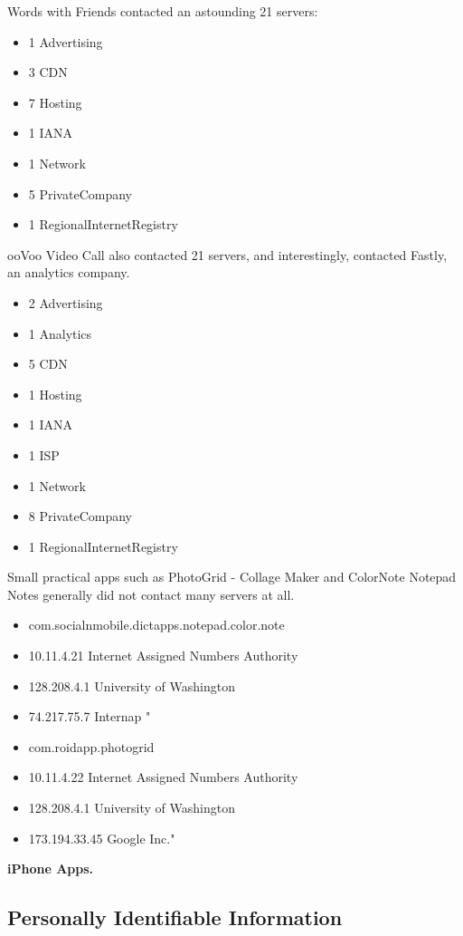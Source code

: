    Words with Friends contacted an astounding 21 servers:
\begin{itemize}
\item    1 Advertising
\item    3 CDN
\item    7 Hosting
\item    1 IANA
\item    1 Network
\item    5 PrivateCompany
\item    1 RegionalInternetRegistry
\end{itemize}
ooVoo Video Call also contacted 21 servers, and interestingly, contacted Fastly, an analytics company. 
\begin{itemize}
\item    2 Advertising
\item    1 Analytics
\item    5 CDN
\item    1 Hosting
  \item  1 IANA
\item    1 ISP
 \item   1 Network
\item    8 PrivateCompany
  \item  1 RegionalInternetRegistry
\end{itemize}

Small practical apps such as PhotoGrid - Collage Maker and ColorNote Notepad Notes generally did not contact many servers at all.
\begin{itemize} 
\item com.socialnmobile.dictapps.notepad.color.note
\item 10.11.4.21	Internet Assigned Numbers Authority
\item 128.208.4.1	University of Washington
\item 74.217.75.7	Internap "
\item com.roidapp.photogrid
\item 10.11.4.22	Internet Assigned Numbers Authority
\item 128.208.4.1	University of Washington
\item 173.194.33.45	Google Inc."
\end{itemize}

  {\bf iPhone Apps.}

\subsection{Personally Identifiable Information}
 
